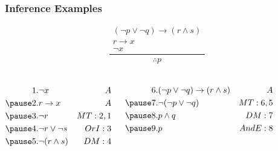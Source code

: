 \documentclass[dvipsnames]{beamer}
\begin{document}
\begin{frame}
  \frametitle{Inference Examples}

  \[
  \frac
    {
      \begin{array}{c}
        (\neg p \vee \neg q) \rightarrow (r \wedge s)\\
        r \rightarrow x\\
        \neg x
      \end{array}
    }
    {
      \therefore p
    }
  \]

  \pause
  \begin{columns}[t]
    \begin{eqnarray*}
      1. & \neg x                                        & A\\
      \pause
      2. & r \rightarrow x                               & A\\
      \pause
      3. & \neg r                                        & MT:2,1\\
      \pause
      4. & \neg r \vee \neg s                            & OrI:3\\
      \pause
      5. & \neg (r \wedge s)                             & DM:4
    \end{eqnarray*}

    \pause
    \begin{eqnarray*}
      6. & (\neg p \vee \neg q) \rightarrow (r \wedge s) & A\\
      \pause
      7. & \neg (\neg p \vee \neg q)                     & MT:6,5\\
      \pause
      8. & p \wedge q                                    & DM:7\\
      \pause
      9. & p                                             & AndE:8
    \end{eqnarray*}
  \end{columns}
\end{frame}
\end{document}
